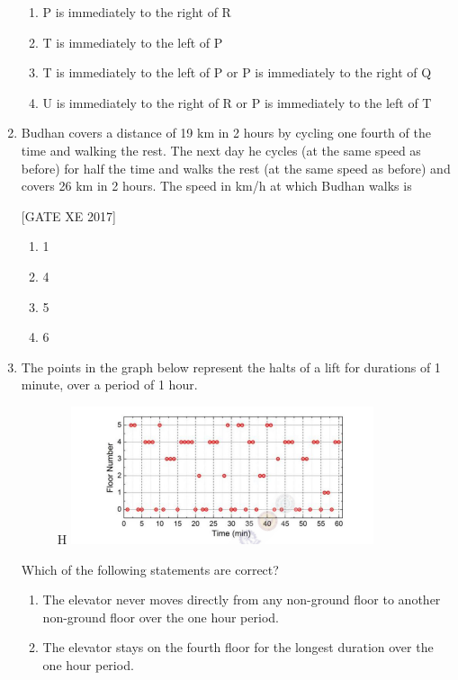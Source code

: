 \documentclass[journal,12pt,onecolumn]{IEEEtran}
\theoremstyle{remark}
\begin{document}
\begin{enumerate}
\begin{enumerate}
    \item P is immediately to the right of R
    \item T is immediately to the left of P
    \item T is immediately to the left of P or P is immediately to the right of Q
    \item U is immediately to the right of R or P is immediately to the left of T
\end{enumerate}




\item Budhan covers a distance of 19 km in 2 hours by cycling one fourth of the time and walking the rest. The next day he cycles (at the same speed as before) for half the time and walks the rest (at the same speed as before) and covers 26 km in 2 hours. The speed in km/h at which Budhan walks is

\hfill [GATE XE 2017]
\begin{multicols}{4}
\begin{enumerate}
    \item 1
    \item 4
    \item 5
    \item 6
\end{enumerate}
\end{multicols}

\item The points in the graph below represent the halts of a lift for durations of 1 minute, over a period of 1 hour.

\begin{figure}{H}
    \centering
    \includegraphics[width=0.5\linewidth]{figs/fig1.png}
    \caption{}
    \label{fig:fig1}
\end{figure}

Which of the following statements are correct?

\begin{enumerate}
    \item The elevator never moves directly from any non-ground floor to another non-ground floor over the one hour period.
    \item The elevator stays on the fourth floor for the longest duration over the one hour period.
\end{enumerate}


\end{enumerate}
\end{document}
